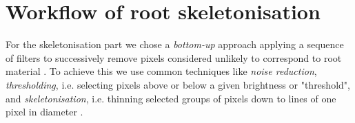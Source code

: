 %
%
%


\section{Workflow of root skeletonisation}\label{sec:workflow}

For the skeletonisation part we chose a \textit{bottom-up} approach applying a sequence of filters to successively remove pixels considered unlikely to correspond to root material \cite{pound2013rootnav}. To achieve this we use common techniques like \textit{noise reduction}, \textit{thresholding}, i.e. selecting pixels above or below a given brightness or "threshold", and \textit{skeletonisation}, i.e. thinning selected groups of pixels down to lines of one pixel in diameter \cite{pound2013rootnav}. 

